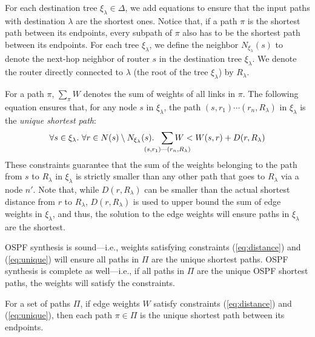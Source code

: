 For each destination tree $\xi_\lambda\in\Delta$, we add equations to ensure 
that the input paths with destination $\lambda$ are the shortest ones.
Notice that, if a path $\pi$
is the shortest path between its endpoints, every 
subpath of $\pi$ also has to be the shortest path between its endpoints.
For each tree $\xi_\lambda$, we define the neighbor
 $N_{\xi_\lambda}(s)$ to denote the 
next-hop neighbor of router $s$ in the destination tree $\xi_\lambda$. 
We denote the router directly connected 
to $\lambda$ (the root of the tree $\xi_\lambda$) by $R_\lambda$.

For a path $\pi$, 
$\sum_{\pi} W$ denotes the sum of weights of all 
links in $\pi$. 
The following equation ensures that, for any node $s$ in 
$\xi_\lambda$, 
the path $(s,r_1)\cdots (r_n,R_\lambda)$ 
in $\xi_\lambda$ is the 
\emph{unique shortest path}:
\begin{equation} \label{eq:unique}
\forall s \in \xi_\lambda. ~
\forall r \in N(s) \setminus N_{\xi_\lambda}(s).~~
\sum_{\mathclap{\substack{(s,r_1)\cdots (r_n,R_\lambda)}}} 
W < W(s,r) + D(r, R_\lambda)
\end{equation}
These constraints guarantee that 
the sum of the weights belonging to the path 
from $s$ to $R_\lambda$ in $\xi_\lambda$ 
is strictly smaller than 
any other path that goes to $R_\lambda$ via 
a node $n'$. Note that,
while $D(r, R_\lambda)$ can be smaller 
than the actual shortest
distance from $r$ to $R_\lambda$, 
$D(r, R_\lambda)$ is used to upper bound the sum of edge weights 
in $\xi_\lambda$, and  
thus, the solution to the edge weights will ensure 
paths in $\xi_\lambda$ are the shortest. 

OSPF synthesis is sound---i.e., weights satisfying
constraints (\ref{eq:distance}) and (\ref{eq:unique}) 
will ensure all paths in $\Pi$ are the unique shortest paths. 
OSPF synthesis is complete as well---i.e., if all 
paths in $\Pi$ are the unique OSPF shortest paths, 
the weights will satisfy the constraints. 

\iffull
\begin{theorem}
For a set of paths $\Pi$, if edge weights 
$W$ satisfy constraints (\ref{eq:distance}) and (\ref{eq:unique}), then 
each path $\pi \in \Pi$ is the unique shortest path between its endpoints. 
\end{theorem}

\fi


